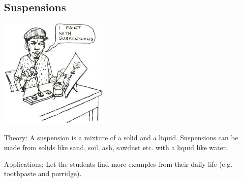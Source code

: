 \begin{multicols}{2}
%
%

\subsection{Suspensions}

\begin{center}
\includegraphics[width=0.4\textwidth]{./img/source/suspensions.jpg}
\end{center}

\begin{description*}
\item[Theory:]{A suspension is a mixture of a solid and a
liquid. Suspensions can be made from solids
like sand, soil, ash, sawdust etc. with a liquid
like water. }
\item[Applications:]{Let the students find more examples
from their daily life (e.g. toothpaste and
porridge).}
\end{description*}


\end{multicols}

